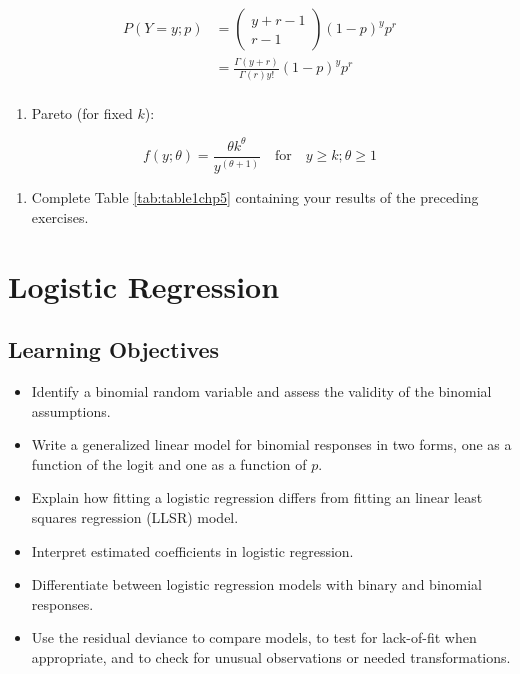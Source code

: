 \documentclass[
]{krantz}
\providecommand{\tightlist}{%
  \setlength{\itemsep}{0pt}\setlength{\parskip}{0pt}}
\begin{document}
\begin{align*}
P(Y=y; p) & =  \left(\begin{array} {c}  y+r-1\\r-1  \end{array}\right)(1-p)^{y}p^r \nonumber \\
 & =  \frac{\Gamma(y+r)}{\Gamma(r)y!} (1-p)^{y}p^r  \\
\end{align*}

\begin{enumerate}
\def\labelenumi{\alph{enumi})}
\setcounter{enumi}{9}
\tightlist
\item
  Pareto (for fixed \(k\)):
\end{enumerate}

\[f(y; \theta)=\frac{\theta k^\theta}{y^{(\theta+1)}}\quad \textrm{for}\quad y\geq k; \theta \geq 1\]

\begin{enumerate}
\def\labelenumi{\arabic{enumi}.}
\setcounter{enumi}{1}
\tightlist
\item
  Complete Table \ref{tab:table1chp5} containing your results of the preceding exercises.
\end{enumerate}

\hypertarget{ch-logreg}{%
\chapter{Logistic Regression}\label{ch-logreg}}

\hypertarget{learning-objectives-2}{%
\section{Learning Objectives}\label{learning-objectives-2}}

\begin{itemize}
\tightlist
\item
  Identify a binomial random variable and assess the validity of the binomial assumptions.
\item
  Write a generalized linear model for binomial responses in two forms, one as a function of the logit and one as a function of \(p\).
\item
  Explain how fitting a logistic regression differs from fitting an linear least squares regression (LLSR) model.
\item
  Interpret estimated coefficients in logistic regression.
\item
  Differentiate between logistic regression models with binary and binomial responses.
\item
  Use the residual deviance to compare models, to test for lack-of-fit when appropriate, and to check for unusual observations or needed transformations.
\end{itemize}
\end{document}
